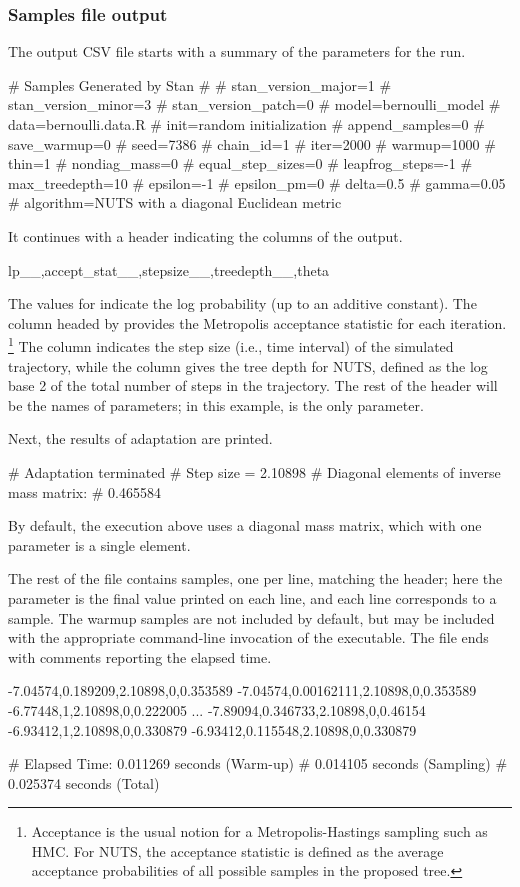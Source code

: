 \documentclass[article]{jss}
\begin{document}
\subsubsection{Samples file output}

The output CSV file starts with a summary of the parameters for the
run.  
%
\begin{Code}
# Samples Generated by Stan
#
# stan_version_major=1
# stan_version_minor=3
# stan_version_patch=0
# model=bernoulli_model
# data=bernoulli.data.R
# init=random initialization
# append_samples=0
# save_warmup=0
# seed=7386
# chain_id=1
# iter=2000
# warmup=1000
# thin=1
# nondiag_mass=0
# equal_step_sizes=0
# leapfrog_steps=-1
# max_treedepth=10
# epsilon=-1
# epsilon_pm=0
# delta=0.5
# gamma=0.05
# algorithm=NUTS with a diagonal Euclidean metric
\end{Code}
%
It continues with a header indicating the columns of the output.
%
\begin{Code}
lp__,accept_stat__,stepsize__,treedepth__,theta
\end{Code}
%
The values for  indicate the log probability (up to an
additive constant).  The column headed by 
provides the Metropolis acceptance statistic for each iteration.%
%
\footnote{Acceptance is the usual notion for a Metropolis-Hastings
  sampling such as HMC.  For NUTS, the acceptance statistic is 
  defined as the average acceptance probabilities of all possible
  samples in the proposed tree.}
%
The column  indicates the step size
(i.e., time interval) of the simulated trajectory, while the column 
 gives the tree depth for NUTS, defined as the 
log base 2 of the total number of steps in the trajectory.
The rest of the header will be the names of parameters; in this
example,  is the only parameter.

Next, the results of adaptation are printed.
%
\begin{Code}
# Adaptation terminated
# Step size = 2.10898
# Diagonal elements of inverse mass matrix:
# 0.465584
\end{Code}
%
By default, the execution above uses a diagonal mass matrix, which
with one parameter is a single element.

The rest of the file contains samples, one per line, matching the
header; here the parameter  is the final value printed on
each line, and each line corresponds to a sample.  The warmup samples
are not included by default, but may be included with the appropriate
command-line invocation of the executable. The file ends with comments reporting the elapsed time.
%
\begin{Code}
-7.04574,0.189209,2.10898,0,0.353589
-7.04574,0.00162111,2.10898,0,0.353589
-6.77448,1,2.10898,0,0.222005
...
-7.89094,0.346733,2.10898,0,0.46154
-6.93412,1,2.10898,0,0.330879
-6.93412,0.115548,2.10898,0,0.330879

# Elapsed Time: 0.011269 seconds (Warm-up)
#               0.014105 seconds (Sampling)
#               0.025374 seconds (Total)
\end{Code}
%
\end{document}
